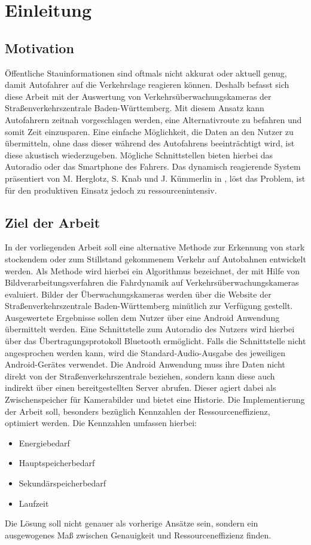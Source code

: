 \chapter{Einleitung}
\label{cha:Einleitung}

\section{Motivation}
\label{sec:Motivation}
Öffentliche Stauinformationen sind oftmals nicht akkurat oder aktuell genug, damit Autofahrer auf die Verkehrslage reagieren können. Deshalb befasst sich diese Arbeit mit der Auswertung von Verkehrsüberwachungskameras der Straßenverkehrszentrale Baden-Württemberg.
Mit diesem Ansatz kann Autofahrern zeitnah vorgeschlagen werden, eine Alternativroute zu befahren und somit Zeit einzusparen.
Eine einfache Möglichkeit, die Daten an den Nutzer zu übermitteln, ohne dass dieser während des Autofahrens beeinträchtigt wird, ist diese akustisch wiederzugeben.
Mögliche Schnittstellen bieten hierbei das Autoradio oder das Smartphone des Fahrers.
Das dynamisch reagierende System präsentiert von M. Herglotz, S. Knab und J. Kümmerlin in \cite{hkkDhbw}, löst das Problem, ist für den produktiven Einsatz jedoch zu ressourcenintensiv.

\section{Ziel der Arbeit}
\label{sec:ZielDerArbeit}
In der vorliegenden Arbeit soll eine alternative Methode zur Erkennung von stark stockendem oder zum Stillstand gekommenem Verkehr auf Autobahnen entwickelt werden. 
Als Methode wird hierbei ein Algorithmus bezeichnet, der mit Hilfe von Bildverarbeitungsverfahren die Fahrdynamik auf Verkehrsüberwachungskameras evaluiert.
Bilder der Überwachungskameras werden über die Website der Straßenverkehrszentrale Baden-Württemberg minütlich zur Verfügung gestellt. 
Ausgewertete Ergebnisse sollen dem Nutzer über eine Android Anwendung übermittelt werden. Eine Schnittstelle zum Autoradio des Nutzers wird hierbei über das Übertragungsprotokoll Bluetooth ermöglicht. Falls die Schnittstelle nicht angesprochen werden kann, wird die Standard-Audio-Ausgabe des jeweiligen Android-Gerätes verwendet.
Die Android Anwendung muss ihre Daten nicht direkt von der Straßenverkehrszentrale beziehen, sondern kann diese auch indirekt über einen bereitgestellten Server abrufen.
Dieser agiert dabei als Zwischenspeicher für Kamerabilder und bietet eine Historie.
Die Implementierung der Arbeit soll, besonders bezüglich Kennzahlen der Ressourceneffizienz, optimiert werden.
Die Kennzahlen umfassen hierbei:
\begin{itemize}
\item{Energiebedarf}
\item{Hauptspeicherbedarf}
\item{Sekundärspeicherbedarf}
\item{Laufzeit}
\end{itemize}
Die Lösung soll nicht genauer als vorherige Ansätze sein, sondern ein ausgewogenes Maß zwischen Genauigkeit und Ressourceneffizienz finden.
